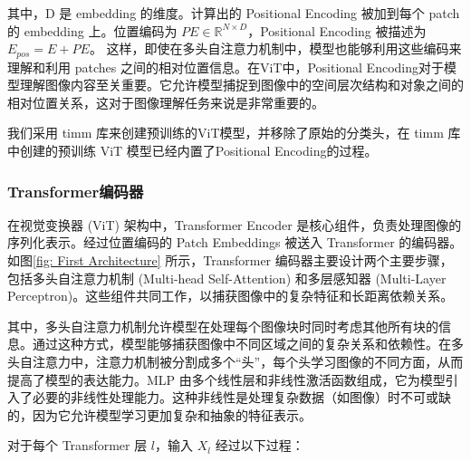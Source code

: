 \documentclass[a4paper]{ctexart}
\begin{document}
其中，D 是 embedding 的维度。计算出的 Positional Encoding 被加到每个 patch 的 embedding 上。位置编码为 $PE \in \mathbb{R}^{N \times D}$，Positional Encoding 被描述为 $E_{pos} = E + PE$。 这样，即使在多头自注意力机制中，模型也能够利用这些编码来理解和利用 patches 之间的相对位置信息。在ViT中，Positional Encoding对于模型理解图像内容至关重要。它允许模型捕捉到图像中的空间层次结构和对象之间的相对位置关系，这对于图像理解任务来说是非常重要的。
	
我们采用 timm 库来创建预训练的ViT模型，并移除了原始的分类头，在 timm 库中创建的预训练 ViT 模型已经内置了Positional Encoding的过程。
	
\subsubsection{Transformer编码器}
	
在视觉变换器 (ViT) 架构中，Transformer Encoder 是核心组件，负责处理图像的序列化表示。经过位置编码的 Patch Embeddings 被送入 Transformer 的编码器。如图\ref{fig: First Architecture} 所示，Transformer 编码器主要设计两个主要步骤，包括多头自注意力机制 (Multi-head Self-Attention) 和多层感知器 (Multi-Layer Perceptron)。这些组件共同工作，以捕获图像中的复杂特征和长距离依赖关系。
	
其中，多头自注意力机制允许模型在处理每个图像块时同时考虑其他所有块的信息。通过这种方式，模型能够捕获图像中不同区域之间的复杂关系和依赖性。在多头自注意力中，注意力机制被分割成多个“头”，每个头学习图像的不同方面，从而提高了模型的表达能力。MLP 由多个线性层和非线性激活函数组成，它为模型引入了必要的非线性处理能力。这种非线性是处理复杂数据（如图像）时不可或缺的，因为它允许模型学习更加复杂和抽象的特征表示。
	
对于每个 Transformer 层 $l$，输入 $X_l$ 经过以下过程：
	
\end{document}
